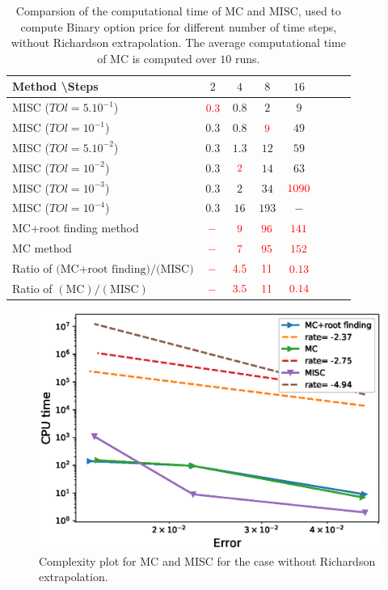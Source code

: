 \documentclass[11pt]{article}
\begin{document}
\begin{table}[h!]
	\centering
	\begin{tabular}{l*{6}{c}r}
		Method \textbackslash  Steps            & $2$ & $4$ & $8$ & $16$ &   \\
		\hline
		MISC ($TOl=5.10^{-1}$)  & ${\color{red}0.3}$ & $0.8$ & $2$ & $9$  \\
		MISC ($TOl=10^{-1}$)   & $0.3$ & $0.8$ & ${\color{red}9}$ & $49$  \\
		MISC ($TOl=5.10^{-2}$)   & $0.3$ & $1.3$ & $12$ & $59$  \\
		MISC ($TOl=10^{-2}$)   & $0.3$ & ${\color{red}2}$ & $14$ & $63$  \\
		MISC ($TOl=10^{-3}$)   & $0.3$ & $2$ & $34$ & ${\color{red}1090}$  \\
    	MISC ($TOl=10^{-4}$)   & $0.3$ & $16$ & $193$ & $-$  \\
		\hline
		MC+root finding method    & ${\color{red}-}$ & ${\color{red}9}$ & ${\color{red}96}$ & ${\color{red}141}$  \\
		MC method    & ${\color{red}-}$ & ${\color{red}7}$ & ${\color{red}95}$ & ${\color{red}152}$  \\
		\hline
		Ratio of	$\text{(MC+root finding)}/\text{(MISC)}$ & ${\color{red}-}$ & ${\color{red}4.5}$ & ${\color{red}11}$ & ${\color{red}0.13}$  \\
			Ratio of	$(\text{MC})/(\text{MISC})$ & ${\color{red}-}$ & ${\color{red}3.5}$ & ${\color{red}11}$ & ${\color{red}0.14}$  \\
			\hline
	\end{tabular}
	\caption{Comparsion of the computational time of  MC and MISC, used to compute Binary option price  for different number of time steps, without Richardson extrapolation. The average computational time of MC is computed over $10$ runs.}
	\label{Comparsion of the computational time of  MC and MISC, used to compute Binary option price  for different number of time steps, without Richardson extrapolation}
\end{table}





	\begin{figure}[h!]
	\centering
	\includegraphics[width=0.7\linewidth]{./figures/Binary_Complexity_rates/error_vs_time}
	
	\caption{Complexity plot for MC and MISC for the case without Richardson extrapolation.}
	\label{fig:Complexity plot for MC and MISC , Binary, Non rich}
\end{figure}
\end{document}
